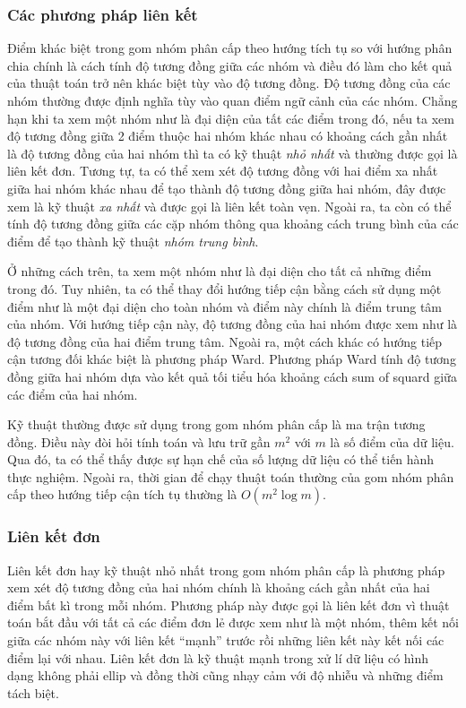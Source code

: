 %		

\subsubsection{Các phương pháp liên kết}
Điểm khác biệt trong gom nhóm phân cấp theo hướng tích tụ so với hướng phân chia chính là cách tính độ tương đồng giữa các nhóm và điều đó làm cho kết quả của thuật toán trở nên khác biệt tùy vào độ tương đồng.
Độ tương đồng của các nhóm thường được định nghĩa tùy vào quan điểm ngữ cảnh của các nhóm.
Chẳng hạn khi ta xem một nhóm như là đại diện của tất các điểm trong đó, nếu ta xem độ tương đồng giữa 2 điểm thuộc hai nhóm khác nhau có khoảng cách gần nhất là độ tương đồng của hai nhóm thì ta có kỹ thuật \textit{nhỏ nhất} và thường được gọi là liên kết đơn.
Tương tự, ta có thể xem xét độ tương đồng với hai điểm xa nhất giữa hai nhóm khác nhau để tạo thành độ tương đồng giữa hai nhóm, đây được xem là kỹ thuật \textit{xa nhất} và được gọi là liên kết toàn vẹn.
Ngoài ra, ta còn có thể tính độ tương đồng giữa các cặp nhóm thông qua khoảng cách trung bình của các điểm để tạo thành kỹ thuật \textit{nhóm trung bình}.

Ở những cách trên, ta xem một nhóm như là đại diện cho tất cả những điểm trong đó.
Tuy nhiên, ta có thể thay đổi hướng tiếp cận bằng cách sử dụng một điểm như là một đại diện cho toàn nhóm và điểm này chính là điểm trung tâm của nhóm.
Với hướng tiếp cận này, độ tương đồng của hai nhóm được xem như là độ tương đồng của hai điểm trung tâm.
Ngoài ra, một cách khác có hướng tiếp cận tương đối khác biệt là phương pháp Ward.
Phương pháp Ward tính độ tương đồng giữa hai nhóm dựa vào kết quả tối tiểu hóa khoảng cách sum of squard giữa các điểm của hai nhóm.

Kỹ thuật thường được sử dụng trong gom nhóm phân cấp là ma trận tương đồng.
Điều này đòi hỏi tính toán và lưu trữ gần $m^2$ với $m$ là số điểm của dữ liệu.
Qua đó, ta có thể thấy được sự hạn chế của số lượng dữ liệu có thể tiến hành thực nghiệm.
Ngoài ra, thời gian để chạy thuật toán thường của gom nhóm phân cấp theo hướng tiếp cận tích tụ thường là $O(m^2 \log{m}).$

\subsubsection{Liên kết đơn}		
Liên kết đơn hay kỹ thuật nhỏ nhất trong gom nhóm phân cấp là phương pháp xem xét độ tương đồng của hai nhóm chính là khoảng cách gần nhất của hai điểm bất kì trong mỗi nhóm. 
Phương pháp này được gọi là liên kết đơn vì thuật toán bắt đầu với tất cả các điểm đơn lẻ được xem như là một nhóm, thêm kết nối giữa các nhóm này với liên kết ``mạnh'' trước rồi những liên kết này kết nối các điểm lại với nhau.
Liên kết đơn là kỹ thuật mạnh trong xử lí dữ liệu có hình dạng không phải ellip và đồng thời cũng nhạy cảm với độ nhiễu và những điểm tách biệt.

